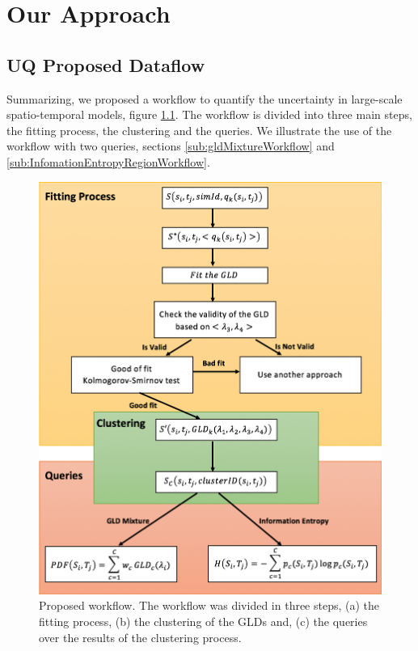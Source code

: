 \chapter{Our Approach}\label{cap:our_approach}

\section{UQ Proposed Dataflow}
Summarizing, we proposed a workflow to quantify the uncertainty in large-scale spatio-temporal models, figure \ref{fig:workflow}. The workflow is divided into three main steps, the fitting process, the clustering and the queries. We illustrate the use of the workflow with  two queries, sections \ref{sub:gldMixtureWorkflow} and \ref{sub:InfomationEntropyRegionWorkflow}.

\begin{figure}[H]
    \centering
    \includegraphics[width=1\textwidth]{img/Diagram.png}
    \caption{Proposed workflow. The workflow was divided in three steps, (a) the fitting process, (b) the clustering of the GLDs and, (c) the queries over the results of the clustering process.}
    \label{fig:workflow}
\end{figure}

